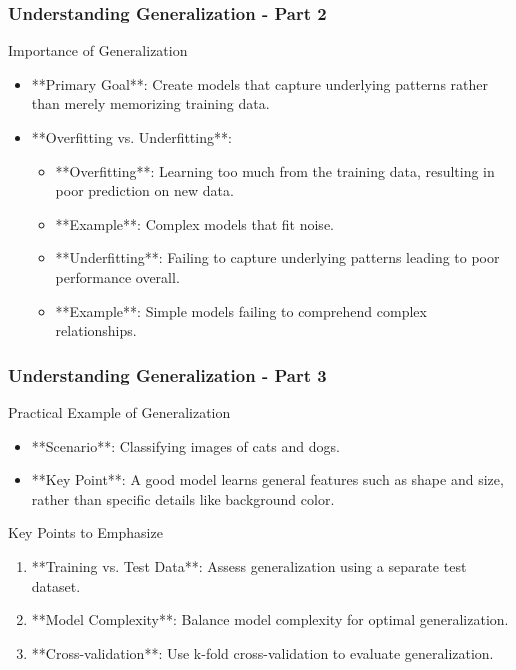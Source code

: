 \documentclass[aspectratio=169]{beamer}
\begin{document}
\begin{frame}[fragile]
    \frametitle{Understanding Generalization - Part 2}
    \begin{block}{Importance of Generalization}
        \begin{itemize}
            \item **Primary Goal**: Create models that capture underlying patterns rather than merely memorizing training data.
            \item **Overfitting vs. Underfitting**:
                \begin{itemize}
                    \item **Overfitting**: Learning too much from the training data, resulting in poor prediction on new data.
                    \item **Example**: Complex models that fit noise.
                    \item **Underfitting**: Failing to capture underlying patterns leading to poor performance overall.
                    \item **Example**: Simple models failing to comprehend complex relationships.
                \end{itemize}
        \end{itemize}
    \end{block}
\end{frame}

\begin{frame}[fragile]
    \frametitle{Understanding Generalization - Part 3}
    \begin{block}{Practical Example of Generalization}
        \begin{itemize}
            \item **Scenario**: Classifying images of cats and dogs.
            \item **Key Point**: A good model learns general features such as shape and size, rather than specific details like background color.
        \end{itemize}
    \end{block}

    \begin{block}{Key Points to Emphasize}
        \begin{enumerate}
            \item **Training vs. Test Data**: Assess generalization using a separate test dataset.
            \item **Model Complexity**: Balance model complexity for optimal generalization.
            \item **Cross-validation**: Use k-fold cross-validation to evaluate generalization.
        \end{enumerate}
    \end{block}
\end{frame}
\end{document}
